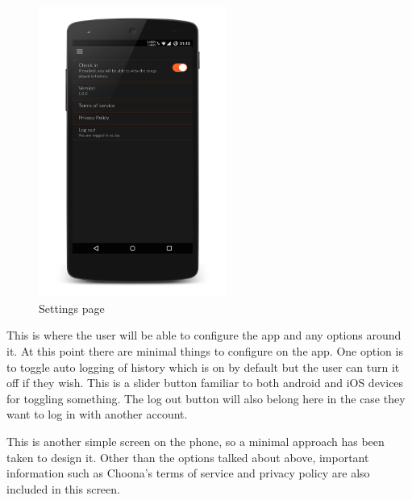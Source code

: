 \noindent
\begin{figure}[h!]
\centering
\includegraphics[width=0.55\textwidth]{./img/settingsframed.png}
\caption{Settings page}
\label{fig:settingspage}
\end{figure}

This is where the user will be able to configure the app and any options around it. At this point there are minimal things to configure on the app. One option is to toggle auto logging of history which is on by default but the user can turn it off if they wish. This is a slider button familiar to both android and iOS devices for toggling something. The log out button will also belong here in the case they want to log in with another account. 

This is another simple screen on the phone, so a minimal approach has been taken to design it. Other than the options talked about above, important information such as Choona's terms of service and privacy policy are also included in this screen.